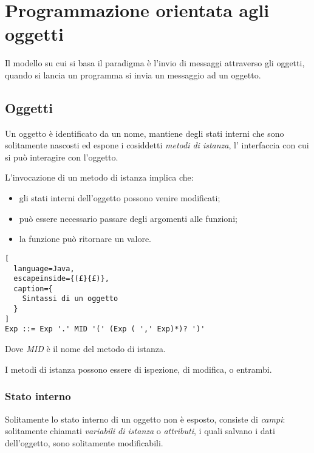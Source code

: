 \chapter{Programmazione orientata agli oggetti}
Il modello su cui si basa il paradigma è l'invio di messaggi attraverso gli
oggetti, quando si lancia un programma si invia un messaggio ad un oggetto.

\section{Oggetti}
Un oggetto è identificato da un nome, mantiene degli stati interni che sono
solitamente nascosti ed espone i cosiddetti \emph{metodi di istanza}, l'
interfaccia con cui si può interagire con l'oggetto.

L'invocazione di un metodo di istanza implica che:
\begin{itemize}
  \item gli stati interni dell'oggetto possono venire modificati;
  \item può essere necessario passare degli argomenti alle funzioni;
  \item la funzione può ritornare un valore.
\end{itemize}

\begin{lstlisting}[
  language=Java,
  escapeinside={(£}{£)},
  caption={
    Sintassi di un oggetto
  }
]
Exp ::= Exp '.' MID '(' (Exp ( ',' Exp)*)? ')'
\end{lstlisting}

Dove \emph{MID} è il nome del metodo di istanza.

I metodi di istanza possono essere di ispezione, di modifica, o entrambi.

\subsection{Stato interno}
Solitamente lo stato interno di un oggetto non è esposto, consiste di \emph{
campi}: solitamente chiamati \emph{variabili di istanza} o \emph{attributi},
i quali salvano i dati dell'oggetto, sono solitamente modificabili.
